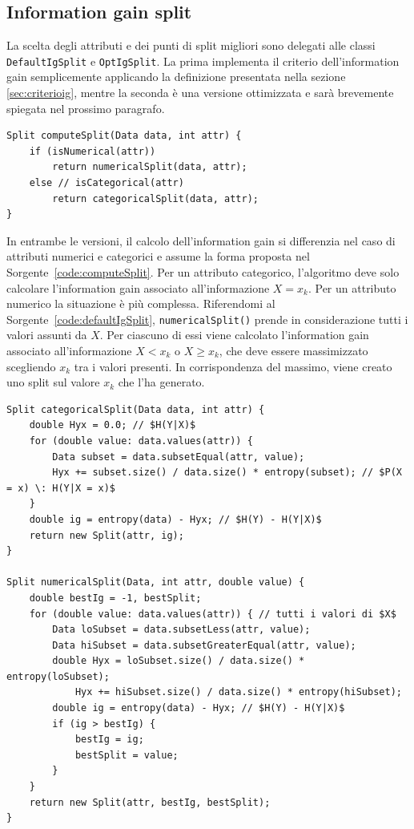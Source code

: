 \documentclass[a4paper,11pt,twoside,openright,fleqn]{book}
\renewcommand{\lstlistingname}{Sorgente}
\newcommand{\code}[1]{\texttt{#1}}
\begin{document}
\subsection{Information gain split} \label{sec:igsplit}

La scelta degli attributi e dei punti di split migliori sono delegati alle classi \code{DefaultIgSplit} e \code{OptIgSplit}. La prima implementa il criterio dell'information gain semplicemente applicando la definizione presentata nella sezione \ref{sec:criterioig}, mentre la seconda è una versione ottimizzata e sarà brevemente spiegata nel prossimo paragrafo.

\begin{lstlisting}[float=htbp,caption=Codice per il calcolo dello split,label=code:computeSplit]
Split computeSplit(Data data, int attr) {
    if (isNumerical(attr))
        return numericalSplit(data, attr);
    else // isCategorical(attr)
        return categoricalSplit(data, attr);
}
\end{lstlisting}

In entrambe le versioni, il calcolo dell'information gain si differenzia nel caso di attributi numerici e categorici e assume la forma proposta nel \lstlistingname\ \ref{code:computeSplit}. Per un attributo categorico, l'algoritmo deve solo calcolare l'information gain associato all'informazione $X = x_k$. Per un attributo numerico la situazione è più complessa. Riferendomi al \lstlistingname\ \ref{code:defaultIgSplit}, \code{numericalSplit()} prende in considerazione tutti i valori assunti da $X$. Per ciascuno di essi viene calcolato l'information gain associato all'informazione $X < x_k$ o $X \geq x_k$, che deve essere massimizzato scegliendo $x_k$ tra i valori presenti. In corrispondenza del massimo, viene creato uno split sul valore $x_k$ che l'ha generato.

\begin{lstlisting}[float=btp,mathescape,caption=Codice per il calcolo dell'information gain nel caso di attributi numerici e categorici,label=code:defaultIgSplit]
Split categoricalSplit(Data data, int attr) {
    double Hyx = 0.0; // $H(Y|X)$
    for (double value: data.values(attr)) {
        Data subset = data.subsetEqual(attr, value);
        Hyx += subset.size() / data.size() * entropy(subset); // $P(X = x) \: H(Y|X = x)$
    }
    double ig = entropy(data) - Hyx; // $H(Y) - H(Y|X)$
    return new Split(attr, ig);
}

Split numericalSplit(Data, int attr, double value) {
	double bestIg = -1, bestSplit;
	for (double value: data.values(attr)) { // tutti i valori di $X$
		Data loSubset = data.subsetLess(attr, value);
		Data hiSubset = data.subsetGreaterEqual(attr, value);
		double Hyx = loSubset.size() / data.size() * entropy(loSubset);
			Hyx += hiSubset.size() / data.size() * entropy(hiSubset);
		double ig = entropy(data) - Hyx; // $H(Y) - H(Y|X)$
		if (ig > bestIg) {
			bestIg = ig;
			bestSplit = value;
		}
	}
	return new Split(attr, bestIg, bestSplit);
}
\end{lstlisting}
\end{document}
